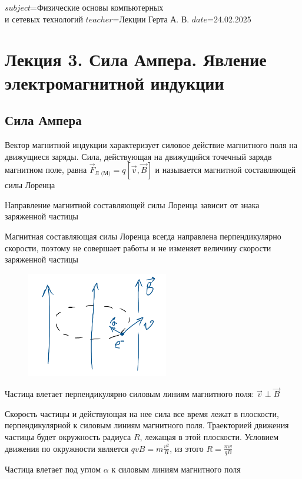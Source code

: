 $subject$=Физические основы компьютерных \\ и сетевых технологий
$teacher$=Лекции Герта А. В.
$date$=24.02.2025

\section{Лекция 3. Сила Ампера. Явление электромагнитной индукции}

\subsection{Сила Ампера}

Вектор магнитной индукции характеризует силовое действие магнитного поля на движущиеся заряды. 
Сила, действующая на движущийся точечный зарядв магнитном поле, равна $\vec{F}_{\text{Л (М)}} = q [\vec{v}, \vec{B}]$
и называется магнитной составляющей силы Лоренца

Направление магнитной составляющей силы Лоренца зависит от знака заряженной частицы

Магнитная составляющая силы Лоренца всегда направлена перпендикулярно скорости, поэтому не совершает работы и не изменяет величину скорости заряженной частицы

\begin{figure}
    \includegraphics[width=6.2cm]{physics2/images/physics2_2025_02_24_1}
\end{figure}

\Ex Частица влетает перпендикулярно силовым линиям магнитного поля: $\vec{v} \perp \vec{B}$

Скорость частицы и действующая на нее сила все время лежат в плоскости, перпендикулярной к силовым линиям магнитного поля. 
Траекторией движения частицы будет окружность радиуса $R$, лежащая в этой плоскости. 
Условием движения по окружности является $q v B = m\frac{v^2}{R}$, из этого $R = \frac{mv}{qB}$


\Ex Частица влетает под углом $\alpha$ к силовым линиям магнитного поля

